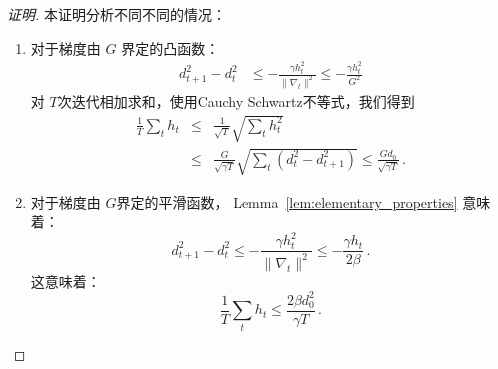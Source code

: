\begin{proof}[证明]
本证明分析不同不同的情况：
\begin{enumerate}
\item
对于梯度由  $G$ 界定的凸函数：
\begin{eqnarray*}
d_{t+1}^2 -  d_t^2 & \leq - \frac{\gamma h_t^2}{\|\nabla_t\|^2} \leq -
                     \frac{\gamma h_t^2}{G^2}  
\end{eqnarray*}
对 $T$次迭代相加求和，使用Cauchy Schwartz不等式，我们得到
\begin{eqnarray*}
\frac{1}{T} \sum_t h_t 
& \leq&  \frac{1}{\sqrt{T}} \sqrt{\sum_t h_t^2} \\
& \leq& \frac{ G}{\sqrt{\gamma T}} \sqrt{\sum_t (d_{t}^2 - d_{t+1}^2)} \leq
\frac{ G d_0 }{\sqrt{\gamma T}} \, .
\end{eqnarray*}

\item
对于梯度由  $G$界定的平滑函数， Lemma~\ref{lem:elementary_properties} 意味着：
\[
d_{t+1}^2 - d_t^2 \leq - \frac{\gamma h_t^2}{\|\nabla_t\|^2} \leq -
\frac{\gamma h_t}{2 \beta} \, .
\]
这意味着：
\[
\frac{1}{T} \sum_t h_t  \leq \frac{2 \beta d_0^2}{\gamma T}\, .
\]


\end{enumerate}
\end{proof}
